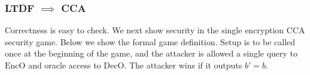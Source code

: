 \documentclass{beamer}
\begin{document}
\begin{frame}
    \frametitle{LTDF $\implies$ CCA}
    Correctness is easy to check. We next show security in the single
    encryption CCA security game. Below we show the formal game definition.
    $\mathrm{Setup}$ is to be called once at the beginning of the game, and
    the attacker is allowed a single query to $\mathrm{EncO}$ and oracle access to
    $\mathrm{DecO}$. The attacker wins if it outputs $b' = b$.
    \begin{center}
        \begin{pchstack}
        \end{pchstack}
    \end{center}

\end{frame}
\end{document}
